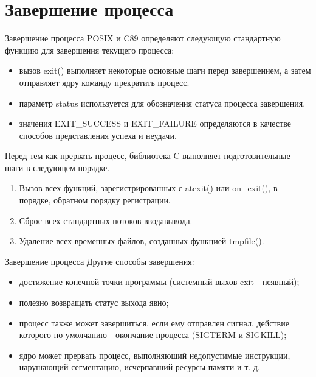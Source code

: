 \documentclass{beamer}
\begin{document}
\section{Завершение процесса}

\begin{frame}{Завершение процесса}
POSIX и C89 определяют следующую стандартную функцию для завершения текущего процесса:
\begin{itemize}
\item вызов exit() выполняет некоторые основные шаги перед завершением, а затем
отправляет ядру команду прекратить процесс.
\item параметр status используется для обозначения статуса процесса завершения.
\item значения EXIT\_SUCCESS и EXIT\_FAILURE определяются в качестве способов представления успеха и неудачи. 
\end{itemize}
Перед тем как прервать процесс, библиотека C выполняет подготовительные
шаги в следующем порядке.
\begin{enumerate}
\item Вызов всех функций, зарегистрированных с atexit() или on\_exit(), в порядке,
обратном порядку регистрации.
\item Сброс всех стандартных потоков ввода­вывода.
\item Удаление всех временных файлов, созданных функцией tmpfile().
\end{enumerate}
\end{frame}

\begin{frame}{Завершение процесса}
Другие способы завершения:
\begin{itemize}
\item достижение конечной точки программы (системный выхов exit - неявный);
\item полезно возвращать статус выхода явно;
\item процесс также может завершиться, если ему отправлен сигнал, действие которого по умолчанию - окончание процесса (SIGTERM и SIGKILL);
\item ядро может прервать процесс, выполняющий недопустимые инструкции, нарушающий сегментацию, исчерпавший ресурсы памяти и т. д.
\end{itemize}
\end{frame}
\end{document}
